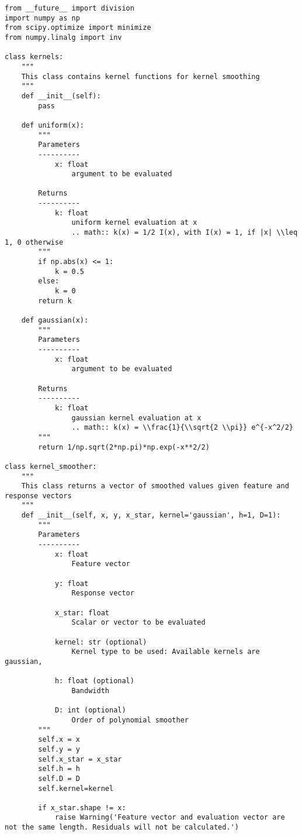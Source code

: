 \documentclass[10pt]{article}
\begin{document}
        \begin{lstlisting}
from __future__ import division
import numpy as np
from scipy.optimize import minimize
from numpy.linalg import inv

class kernels:
    """
    This class contains kernel functions for kernel smoothing
    """
    def __init__(self):
        pass

    def uniform(x):
        """
        Parameters
        ----------
            x: float
                argument to be evaluated

        Returns
        ----------
            k: float
                uniform kernel evaluation at x
                .. math:: k(x) = 1/2 I(x), with I(x) = 1, if |x| \\leq 1, 0 otherwise
        """
        if np.abs(x) <= 1:
            k = 0.5
        else:
            k = 0
        return k

    def gaussian(x):
        """
        Parameters
        ----------
            x: float
                argument to be evaluated

        Returns
        ----------
            k: float
                gaussian kernel evaluation at x
                .. math:: k(x) = \\frac{1}{\\sqrt{2 \\pi}} e^{-x^2/2}
        """
        return 1/np.sqrt(2*np.pi)*np.exp(-x**2/2)

class kernel_smoother:
    """
    This class returns a vector of smoothed values given feature and response vectors
    """
    def __init__(self, x, y, x_star, kernel='gaussian', h=1, D=1):
        """
        Parameters
        ----------
            x: float
                Feature vector

            y: float
                Response vector

            x_star: float
                Scalar or vector to be evaluated

            kernel: str (optional)
                Kernel type to be used: Available kernels are gaussian,
                
            h: float (optional)
                Bandwidth

            D: int (optional)
                Order of polynomial smoother
        """
        self.x = x
        self.y = y
        self.x_star = x_star
        self.h = h
        self.D = D
        self.kernel=kernel

        if x_star.shape != x:
            raise Warning('Feature vector and evaluation vector are not the same length. Residuals will not be calculated.')


\end{lstlisting}
\end{document}
